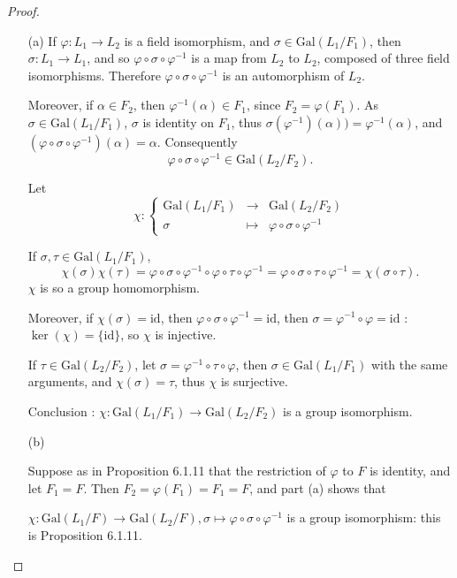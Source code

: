 \documentclass[11pt,a4paper]{article}
\begin{document}
\begin{proof}
\begin{enumerate}
\item[(a)]
If $\varphi : L_1 \to L_2$ is a field isomorphism, and $\sigma \in \mathrm{Gal}(L_1/F_1)$, then ${\sigma : L_1 \to L_1}$, and so $\varphi \circ \sigma \circ \varphi^{-1}$ is a map from $L_2$ to $L_2$, composed of three field isomorphisms. Therefore $\varphi \circ \sigma \circ \varphi^{-1}$ is an automorphism of $L_2$.

Moreover, if $\alpha \in F_2$, then $\varphi^{-1}(\alpha) \in F_1$, since $F_2 = \varphi(F_1)$. As $\sigma \in \mathrm{Gal}(L_1/F_1)$, $\sigma$ is identity on $F_1$, thus $\sigma ( \varphi^{-1})(\alpha))  = \varphi^{-1}(\alpha)$, and $(\varphi \circ \sigma \circ \varphi^{-1}) (\alpha) = \alpha$. Consequently $$\varphi \circ \sigma \circ \varphi^{-1} 
\in  \mathrm{Gal}(L_2/F_2).$$

Let
$$
\chi : 
\left\{
\begin{array}{ccc}
 \mathrm{Gal}(L_1/F_1) & \to  &  \mathrm{Gal}(L_2/F_2) \\
 \sigma  &\mapsto    &  \varphi \circ \sigma \circ \varphi^{-1}
\end{array}
\right.
$$

If $\sigma,\tau \in  \mathrm{Gal}(L_1/F_1)$, $$\chi(\sigma) \chi(\tau) = \varphi \circ \sigma \circ \varphi^{-1} \circ \varphi \circ \tau  \circ \varphi^{-1} =  \varphi \circ \sigma \circ \tau  \circ \varphi^{-1} = \chi(\sigma \circ \tau).$$
$\chi$ is so a group homomorphism.

Moreover, if $\chi(\sigma) = \mathrm{id}$, then $\varphi \circ \sigma \circ \varphi^{-1} = \mathrm{id}$, 
then $\sigma = \varphi^{-1} \circ \varphi = \mathrm{id}$ : $\ker(\chi) = \{\mathrm{id}\}$, so $\chi$ is injective.

If $\tau \in  \mathrm{Gal}(L_2/F_2)$, let $\sigma = \varphi^{-1} \circ \tau \circ \varphi$, then $\sigma \in  \mathrm{Gal}(L_1/F_1)$ with the same arguments, and $\chi(\sigma) = \tau$, thus $\chi$ is surjective.

Conclusion : $\chi : \mathrm{Gal}(L_1/F_1)  \to    \mathrm{Gal}(L_2/F_2)$ is a group isomorphism.

\item[(b)]

Suppose as in  Proposition 6.1.11 that the restriction of $\varphi$ to $F$ is identity, and let $F_1 = F$. Then $F_2 = \varphi(F_1) = F_1 = F$, and part (a) shows that

$\chi : \mathrm{Gal}(L_1/F)  \to    \mathrm{Gal}(L_2/F),\sigma  \mapsto      \varphi \circ \sigma \circ \varphi^{-1}$ is a group isomorphism: this is Proposition 6.1.11.

\end{enumerate}
\end{proof}
\end{document}

